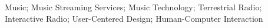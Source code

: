 \noindent Music; Music Streaming Services; Music Technology; Terrestrial Radio; Interactive Radio; User-Centered Design; Human-Computer Interaction